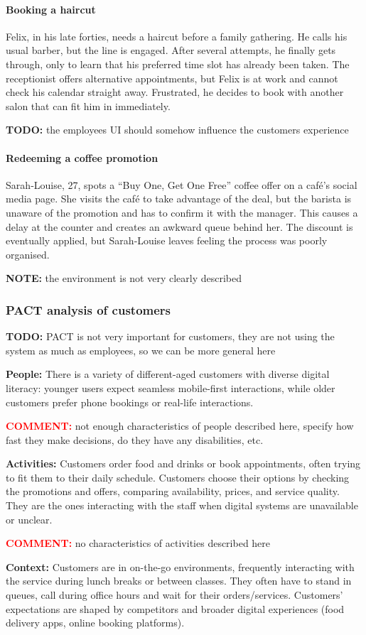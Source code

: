 \documentclass[]{VUMIFTemplateClass}
\newcommand{\yellowcomment}[1]{%
    \begin{tcolorbox}[colback=yellow!80, colframe=yellow!80, arc=0pt, outer arc=0pt, boxrule=0pt, left=3pt, right=3pt, top=3pt, bottom=3pt]
        \textbf{\textcolor{red}{COMMENT:}} #1
    \end{tcolorbox}
}
\newcommand{\noticecomment}[1]{%
    \begin{tcolorbox}[colback=blue!20, colframe=blue!60, arc=0pt, outer arc=0pt, boxrule=1pt, left=3pt, right=3pt, top=3pt, bottom=3pt]
        \textbf{\textcolor{blue!70!black}{NOTE:}} #1
    \end{tcolorbox}
}
\newcommand{\todocomment}[1]{%
    \begin{tcolorbox}[colback=red!20, colframe=red!60, arc=0pt, outer arc=0pt, boxrule=1pt, left=3pt, right=3pt, top=3pt, bottom=3pt]
        \textbf{\textcolor{orange!70!black}{TODO:}} #1
    \end{tcolorbox}
}
\newcommand{\subsubsubsection}[1]{\paragraph{#1}}
\begin{document}
\newpage

\subsubsubsection{Booking a haircut}


Felix, in his late forties, needs a haircut before a family gathering. He calls
his usual barber, but the line is engaged. After several attempts, he finally
gets through, only to learn that his preferred time slot has already been taken.
The receptionist offers alternative appointments, but Felix is at work and
cannot check his calendar straight away. Frustrated, he decides to book with
another salon that can fit him in immediately.
\todocomment{the employees UI should somehow influence the customers experience}

\subsubsubsection{Redeeming a coffee promotion}


Sarah‑Louise, 27, spots a “Buy One, Get One Free” coffee offer on a café’s
social media page. She visits the café to take advantage of the deal, but the
barista is unaware of the promotion and has to confirm it with the manager. This
causes a delay at the counter and creates an awkward queue behind  her. The
discount is eventually applied, but Sarah‑Louise leaves feeling the process was
poorly organised.
\noticecomment{the environment is not very clearly described}

\subsubsection{PACT analysis of customers}
\todocomment{PACT is not very important for customers, they are not using the system as much as employees, so we can be more general here}
\textbf{People:} There is a variety of different-aged customers with diverse
digital literacy: younger users expect seamless mobile-first interactions, while
older customers prefer phone bookings or real-life interactions. 
\yellowcomment{not enough characteristics of people described here, specify how fast they make decisions, do they have any disabilities, etc. }

\textbf{Activities:} Customers order food and drinks or book appointments, often
trying to fit them to their daily schedule. Customers choose their options by
checking the promotions and offers, comparing availability, prices, and service
quality. They are the ones interacting with the staff when digital systems are
unavailable or unclear.

\yellowcomment{no characteristics of activities described here}

\textbf{Context:} Customers are in on-the-go environments, frequently
interacting with the service during lunch breaks or between classes. They often
have to stand in queues, call during office hours and wait for their
orders/services. Customers' expectations are shaped by competitors and broader
digital experiences (food delivery apps, online booking platforms).
\end{document}
